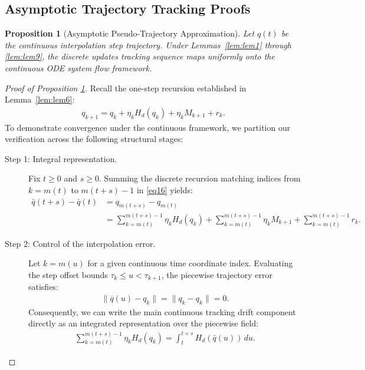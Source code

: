 \documentclass[10pt,a4paper]{amsart}
\newtheorem{proposition}{Proposition}
\begin{document}
\subsection{Asymptotic Trajectory Tracking Proofs}

\begin{proposition}[Asymptotic Pseudo-Trajectory Approximation] \label{prop:tracking}
Let $q(t)$ be the continuous interpolation step trajectory. Under Lemmas~\ref{lem:lem1} through \ref{lem:lem9}, the discrete updates tracking sequence maps uniformly onto the continuous ODE system flow framework.
\end{proposition}

\begin{proof}[Proof of Proposition \ref{prop:tracking}]
Recall the one-step recursion established in Lemma~\ref{lem:lem6}:
\begin{align}
q_{k+1}= q_k + \eta_k H_d(q_k) + \eta_k M_{k+1} + r_k \label{eq16}.
\end{align}
To demonstrate convergence under the continuous framework, we partition our verification across the following structural stages:

\begin{description}
    \item[Step 1: Integral representation.] Fix $t \ge 0$ and $s \ge 0$. Summing the discrete recursion matching indices from $k = m(t)$ to $m(t+s)-1$ in \eqref{eq16} yields:
    \begin{align}
  \bar{q}(t+s)-\bar{q}(t)&=  q_{m(t+s)} - q_{m(t)} \nonumber \\
  &= \sum_{k=m(t)}^{m(t+s)-1} \eta_k H_d(q_k) + \sum_{k=m(t)}^{m(t+s)-1} \eta_k M_{k+1} + \sum_{k=m(t)}^{m(t+s)-1} r_k \label{eq17}.
    \end{align}
    
    \item[Step 2: Control of the interpolation error.] Let $k = m(u)$ for a given continuous time coordinate index. Evaluating the step offset bounds $\tau_k \le u < \tau_{k+1}$, the piecewise trajectory error satisfies:
    \begin{align}
    \| \bar{q}(u) - q_k \| = \| q_k - q_k \| = 0.
    \end{align}
    Consequently, we can write the main continuous tracking drift component directly as an integrated representation over the piecewise field:
    \begin{align}
    \sum_{k=m(t)}^{m(t+s)-1} \eta_k H_d(q_k) = \int_{t}^{t+s} H_d(\bar{q}(u)) \, du.
    \end{align}


\end{description}
\end{proof}
\end{document}
